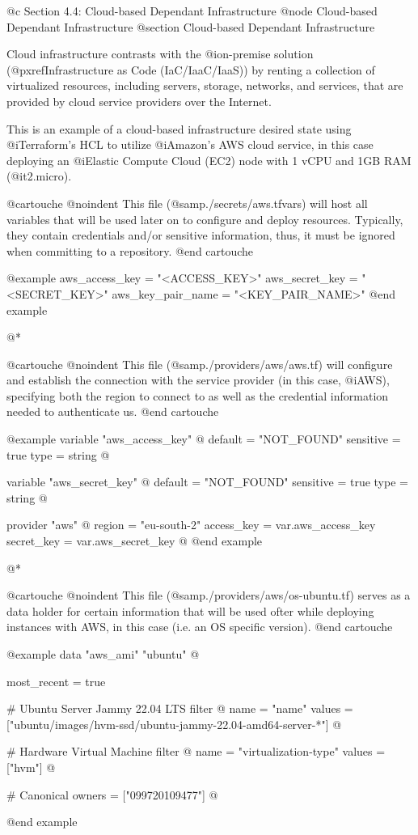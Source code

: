 @c Section 4.4: Cloud-based Dependant Infrastructure
@node Cloud-based Dependant Infrastructure
@section Cloud-based Dependant Infrastructure

Cloud infrastructure contrasts with the @i{on-premise} solution (@pxref{Infrastructure as Code (IaC/IaaC/IaaS)}) by renting a collection of virtualized resources, including servers, storage, networks, and services, that are provided by cloud service providers over the Internet.

This is an example of a cloud-based infrastructure desired state using @i{Terraform's HCL} to utilize @i{Amazon's AWS} cloud service, in this case deploying an @i{Elastic Compute Cloud (EC2)} node with 1 vCPU and 1GB RAM (@i{t2.micro}).

@cartouche
@noindent This file (@samp{./secrets/aws.tfvars}) will host all variables that will be used later on to configure and deploy resources. Typically, they contain credentials and/or sensitive information, thus, it must be ignored when committing to a repository.
@end cartouche

@example
aws_access_key = "<ACCESS_KEY>"
aws_secret_key = "<SECRET_KEY>"
aws_key_pair_name = "<KEY_PAIR_NAME>"
@end example

@*

@cartouche
@noindent This file (@samp{./providers/aws/aws.tf}) will configure and establish the connection with the service provider (in this case, @i{AWS}), specifying both the region to connect to as well as the credential information needed to authenticate us.
@end cartouche

@example
variable "aws_access_key" @{
  default = "NOT_FOUND"
  sensitive = true
  type = string
@}

variable "aws_secret_key" @{
  default = "NOT_FOUND"
  sensitive = true
  type = string
@}

provider "aws" @{
  region = "eu-south-2"
  access_key = var.aws_access_key
  secret_key = var.aws_secret_key
@}
@end example

@*

@cartouche
@noindent This file (@samp{./providers/aws/os-ubuntu.tf}) serves as a data holder for certain information that will be used ofter while deploying instances with AWS, in this case (i.e. an OS specific version).
@end cartouche

@example
data "aws_ami" "ubuntu" @{
  most_recent = true

  # Ubuntu Server Jammy 22.04 LTS
  filter @{
    name = "name"
    values = ["ubuntu/images/hvm-ssd/ubuntu-jammy-22.04-amd64-server-*"]
  @}

  # Hardware Virtual Machine
  filter @{
    name = "virtualization-type"
    values = ["hvm"]
  @}

  # Canonical
  owners = ["099720109477"]
@}
@end example

